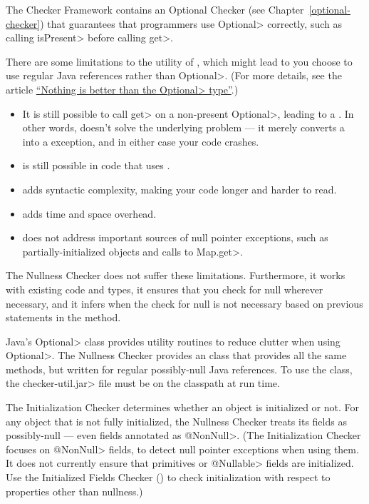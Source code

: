 The Checker Framework contains an Optional Checker (see
Chapter~\ref{optional-checker}) that guarantees that programmers use
\<Optional> correctly, such as calling \<isPresent> before calling \<get>.

There are some limitations to the utility of , which might
lead to you choose to use regular Java references rather than \<Optional>.
(For more details, see the article
\href{https://homes.cs.washington.edu/~mernst/advice/nothing-is-better-than-optional.html}{``Nothing
  is better than the \<Optional> type''}.)

\begin{itemize}
\item
  It is still possible to call \<get> on a non-present \<Optional>, leading
  to a .  In other words, 
  doesn't solve the underlying problem --- it merely converts a
   into a 
  exception, and in either case your code crashes.
\item
   is still possible in code that uses .
\item
   adds syntactic complexity, making your code longer and harder to
  read.
\item
   adds time and space overhead.
\item
   does not address important sources of null pointer
  exceptions, such as partially-initialized objects and calls to \<Map.get>.
\end{itemize}

The Nullness Checker does not suffer these limitations.  Furthermore, it
works with existing code and types, it ensures that you check for null
wherever necessary, and it infers when the check for null is not necessary
based on previous statements in the method.

Java's \<Optional> class provides utility routines to reduce clutter when
using \<Optional>.  The Nullness Checker provides an
 class that provides all the same methods,
but written for regular possibly-null Java references.
To use the  class, the
\<checker-util.jar> file must be on the classpath at run time.



The Initialization Checker determines whether an object is initialized or
not.  For any object that is not fully initialized, the Nullness Checker
treats its fields as possibly-null --- even fields annotated as
\<@NonNull>.
(The Initialization Checker focuses on \<@NonNull> fields, to detect null
pointer exceptions when using them.  It does not
currently ensure that primitives or \<@Nullable> fields are initialized.
Use the Initialized Fields Checker
() to check initialization with
respect to properties other than nullness.)

